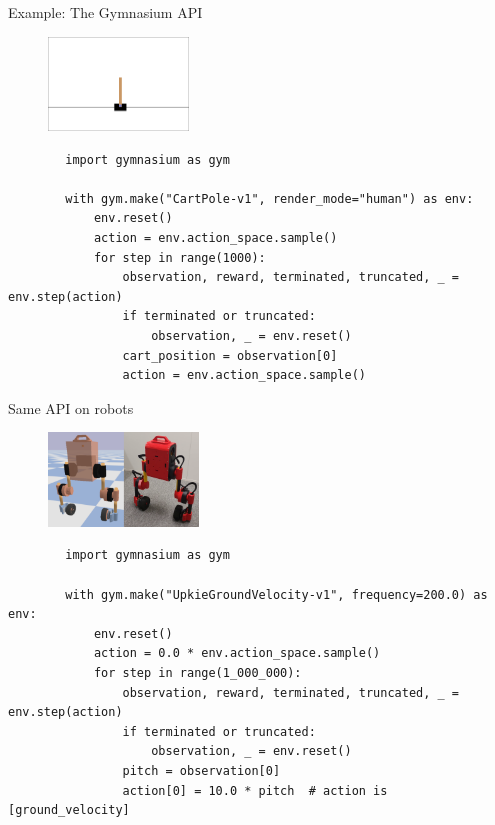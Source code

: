 \documentclass[10pt, aspectratio=1610]{beamer}
\begin{document}
\begin{frame}[fragile]{Example: The Gymnasium API}
    \begin{figure}
        \includegraphics[height=2.5cm]{figures/cart-pole.png}
    \end{figure}
    \begin{verbatim}
        import gymnasium as gym

        with gym.make("CartPole-v1", render_mode="human") as env:
            env.reset()
            action = env.action_space.sample()
            for step in range(1000):
                observation, reward, terminated, truncated, _ = env.step(action)
                if terminated or truncated:
                    observation, _ = env.reset()
                cart_position = observation[0]
                action = env.action_space.sample()
    \end{verbatim}
\end{frame}

\begin{frame}[fragile]{Same API on robots}
    \begin{figure}
        \includegraphics[height=2.5cm]{figures/upkie-sim-real.png}
    \end{figure}
    \begin{verbatim}
        import gymnasium as gym

        with gym.make("UpkieGroundVelocity-v1", frequency=200.0) as env:
            env.reset()
            action = 0.0 * env.action_space.sample()
            for step in range(1_000_000):
                observation, reward, terminated, truncated, _ = env.step(action)
                if terminated or truncated:
                    observation, _ = env.reset()
                pitch = observation[0]
                action[0] = 10.0 * pitch  # action is [ground_velocity]
    \end{verbatim}
\end{frame}
\end{document}
